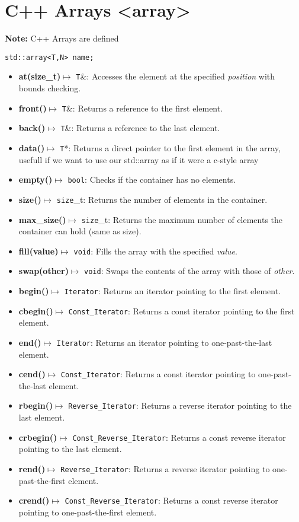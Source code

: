 \documentclass{report}
\begin{document}
    \section{C++ Arrays <array>}
    \bigbreak \noindent 
    \textbf{Note:} C++ Arrays are defined
    \smallbreak \noindent
    \begin{verbatim}
std::array<T,N> name;
    \end{verbatim}
    \begin{itemize}
        \item \textbf{at(size\_t)}$\mapsto$ \texttt{T}\&: Accesses the element at the specified \textit{position} with bounds checking.
        \item \textbf{front()}$\mapsto$ \texttt{T}\&: Returns a reference to the first element.
        \item \textbf{back()}$\mapsto$ \texttt{T}\&: Returns a reference to the last element.
        \item \textbf{data()}$\mapsto$ \texttt{T}*: Returns a direct pointer to the first element in the array, usefull if we want to use our std::array as if it were a c-style array
        \item \textbf{empty()}$\mapsto$ \texttt{bool}: Checks if the container has no elements.
        \item \textbf{size()}$\mapsto$ \texttt{size}\_t: Returns the number of elements in the container.
        \item \textbf{max\_size()}$\mapsto$ \texttt{size}\_t: Returns the maximum number of elements the container can hold (same as size).
        \item \textbf{fill(value)}$\mapsto$ \texttt{void}: Fills the array with the specified \textit{value}.
        \item \textbf{swap(other)}$\mapsto$ \texttt{void}: Swaps the contents of the array with those of \textit{other}.
        \item \textbf{begin()}\(\mapsto\) \texttt{Iterator}: Returns an iterator pointing to the first element.
        \item \textbf{cbegin()}\(\mapsto\) \texttt{Const\_Iterator}: Returns a const iterator pointing to the first element.
        \item \textbf{end()}\(\mapsto\) \texttt{Iterator}: Returns an iterator pointing to one-past-the-last element.
        \item \textbf{cend()}\(\mapsto\) \texttt{Const\_Iterator}: Returns a const iterator pointing to one-past-the-last element.
        \item \textbf{rbegin()}\(\mapsto\) \texttt{Reverse\_Iterator}: Returns a reverse iterator pointing to the last element.
        \item \textbf{crbegin()}\(\mapsto\) \texttt{Const\_Reverse\_Iterator}: Returns a const reverse iterator pointing to the last element.
        \item \textbf{rend()}\(\mapsto\) \texttt{Reverse\_Iterator}: Returns a reverse iterator pointing to one-past-the-first element.
        \item \textbf{crend()}\(\mapsto\) \texttt{Const\_Reverse\_Iterator}: Returns a const reverse iterator pointing to one-past-the-first element.
    \end{itemize}
\end{document}
